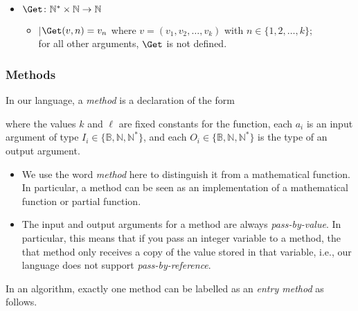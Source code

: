 \documentclass[11pt,a4paper,reqno]{amsart}
\makeatletter
\newcommand{\algorithmstyle}[1]{\renewcommand{\algocf@style}{#1}}
\theoremstyle{plain}
\theoremstyle{definition}
\theoremstyle{definition}
\newenvironment{indentline}{\begin{itemize}[leftmargin=1em]\item[]}{\end{itemize}}
\makeatother
\begin{document}
\begin{itemize}[leftmargin=2em]
\begin{indentline}
          \smallskip
          \noindent
          $\Get\colon \mathbb N^* \times \mathbb N \to \mathbb N$
          \begin{indentline}
            $\mid$\quad $\Get(v,n) = v_n$ where $v = (v_1,v_2,\ldots,v_k)$ with $n\in\{1,2,\ldots,k\}$;\\
            \phantom{$\mid$\quad }for all other arguments, $\Get$ is not defined.
          \end{indentline}
        \end{indentline}
\end{itemize}

\subsubsection{Methods}
\algorithmstyle{plainruled}


In our language, a \emph{method} is a declaration of the form

\begin{algorithm}[H]
   {
  }
\end{algorithm}

\noindent
where the values $k$ and $\ell$ are fixed constants for the function, each $a_i$ is an input argument of type $I_i \in \{\mathbb B, \mathbb N, \mathbb N^*\}$, and each $O_i \in \{\mathbb B, \mathbb N, \mathbb N^*\}$ is the type of an output argument.

\begin{itemize}[leftmargin=2em]
\item
We use the word \emph{method} here to distinguish it from a mathematical function.
In particular, a method can be seen as an implementation of a mathematical function or partial function.

\item
The input and output arguments for a method are always \textit{pass-by-value}.
In particular, this means that if you pass an integer variable to a method, the that method only receives a copy of the value stored in that variable, i.e., our language does not support \textit{pass-by-reference}.
\end{itemize}

\noindent
In an algorithm, exactly one method can be labelled as an \emph{entry method} as follows.
\end{document}
